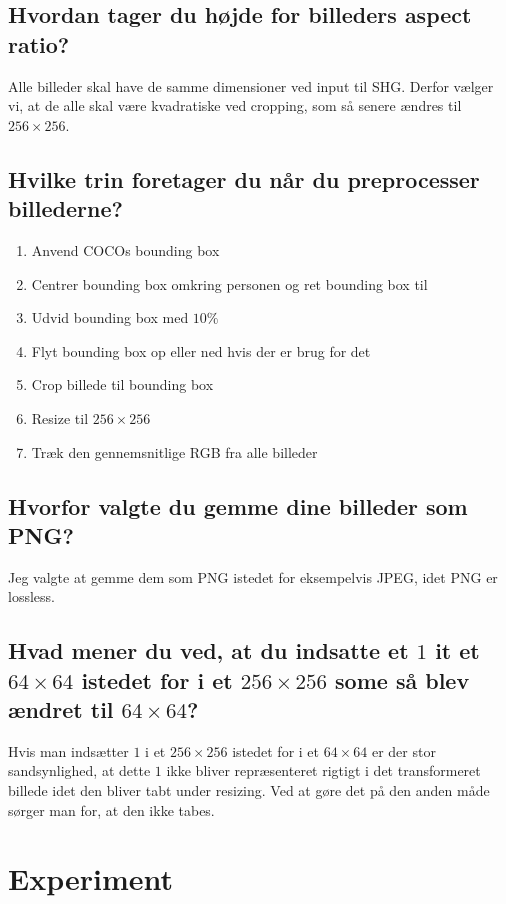 \documentclass[a4paper]{article}
\begin{document}
\subsection{Hvordan tager du højde for billeders aspect ratio?}
Alle billeder skal have de samme dimensioner ved input til SHG. Derfor vælger vi, at de alle skal være kvadratiske ved cropping, som så senere ændres til $256 \times 256$.

\subsection{Hvilke trin foretager du når du preprocesser billederne?}
\begin{enumerate}
    \item Anvend COCOs bounding box
    \item Centrer bounding box omkring personen og ret bounding box til
    \item Udvid bounding box med $10\%$
    \item Flyt bounding box op eller ned hvis der er brug for det
    \item Crop billede til bounding box
    \item Resize til $256 \times 256$
    \item Træk den gennemsnitlige RGB fra alle billeder
\end{enumerate}

\subsection{Hvorfor valgte du gemme dine billeder som PNG?}
Jeg valgte at gemme dem som PNG istedet for eksempelvis JPEG, idet PNG er lossless.

\subsection{Hvad mener du ved, at du indsatte et $1$ it et $64 \times 64$ istedet for i et $256 \times 256$ some så blev ændret til $64 \times 64$?}
Hvis man indsætter $1$ i et $256 \times 256$ istedet for i et $64 \times 64$ er der stor sandsynlighed, at dette $1$ ikke bliver repræsenteret rigtigt i det transformeret billede idet den bliver tabt under resizing. Ved at gøre det på den anden måde sørger man for, at den ikke tabes.

\section{Experiment}
\end{document}
